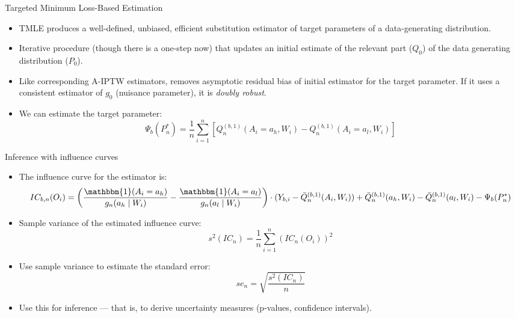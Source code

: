 \documentclass[12pt,t,handout]{beamer}
\begin{document}
\begin{frame}[c]{Targeted Minimum Loss-Based Estimation}

\begin{center}
\begin{itemize}
  \itemsep12pt
  \item TMLE produces a well-defined, unbiased, efficient substitution estimator
    of target parameters of a data-generating distribution.
  \item Iterative procedure (though there is a one-step now) that updates an
    initial estimate of the relevant part ($Q_0$) of the data generating
    distribution ($P_0$).
  \item Like corresponding A-IPTW estimators, removes asymptotic residual bias
    of initial estimator for the target parameter. If it uses a consistent
    estimator of $g_0$ (nuisance parameter), it is \textit{doubly robust}.
  \item We can estimate the target parameter:
    \[
      \Psi_b(P_n^*) = \frac{1}{n}\sum_{i=1}^{n}[Q_n^{(b,1)}(A_i = a_h, W_i) -
      Q_n^{(b,1)}(A_i = a_l, W_i)]
    \]
\end{itemize}
\end{center}

\end{frame}




\begin{frame}[c]{Inference with influence curves}

\begin{center}
\begin{itemize}
  \itemsep12pt
  \item The influence curve for the estimator is:
  \begin{dmath}
    IC_{b,n}(O_i) = \left (\frac{\mathbbm{1}(A_i = a_{h})}{g_n(a_{h} \mid W_i)}
    - \frac{\mathbbm{1}(A_i = a_{l})}{g_n (a_{l} \mid W_i)} \right) \cdot
    (Y_{b,i} - \bar{Q}^{(b,1)}_n(A_i, W_i)) +
    \bar{Q}^{(b,1)}_n(a_{h}, W_i) - \bar{Q}^{(b,1)}_n(a_{l}, W_i) -
    \Psi_{b}(P_n^*)
  \end{dmath}
  \item Sample variance of the estimated influence curve:
    \[
      \textstyle s^2(IC_n) = \frac{1}{n}\sum_{i=1}^n\left(IC_n(O_i) \right)^2
    \]
  \item Use sample variance to estimate the standard error:
    \[
      se_n = \sqrt{\frac{s^2(IC_n)}{n}}
    \]
  \item Use this for inference --- that is, to derive uncertainty measures
    (p-values, confidence intervals).
\end{itemize}
\end{center}

\end{frame}
\end{document}

